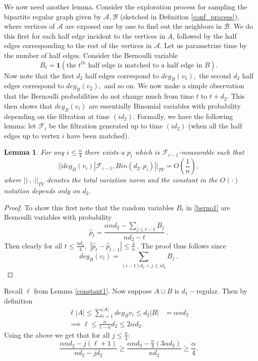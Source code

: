\documentclass[11pt,reqno]{amsart}
\newtheorem{lemma}{Lemma}
\begin{document}
 
We now need another lemma. Consider the exploration process for
sampling the bipartite regular graph given by
$\mathcal{A},\mathcal{B}$ (sketched in  Definition
\ref{conf_process}), where vertices of $\mathcal{A}$ are exposed one
by one to find out the neighbors in $\mathcal{B}.$ We do this first
for each half edge incident to the vertices in $A$,  followed by the half edges corresponding to the rest of the vertices in $\mathcal{A}.$ Let us parametrize time by the number of half edges. Consider the Bernoulli variable
\begin{equation}\label{berno1}
B_t=\mathbf{1}(\mbox{the $t^{th}$ half edge is matched to a half edge in }B).
\end{equation}
Now note that the first $d_2$ half edges correspond to $deg_{B}(v_1),$ the second $d_2$ half edges correspond to $deg_{B}(v_2),$ and so on. 
We now make a simple observation that the Bernoulli probabilities do not change much from time $t$ to $t+d_2.$ This then shows that $deg_{B}(v_i)$ are essentially Binomial variables with probability depending on the filtration at time $(id_2).$
Formally, we have the following lemma: let $\mathcal{F}_i$ be the filtration generated up to time $(id_2)$ (when all the half edges up to vertex $i$ have been matched).
\begin{lemma}\label{totalvar1}For any $i\le \frac{n}{4}$ there exists a $p_i$ which is $\mathcal{F}_{i-1}$-measurable such that $$||deg_{B}(v_i)| \mathcal{F}_{i-1},Bin(d_2,p_i)||_{TV}= O\left(\frac{1}{n}\right),$$  where $||\cdot, \cdot||_{TV}$ denotes the total variation norm and the constant in the $O(\cdot)$ notation depends only on $d_2.$
\end{lemma} 
 
\begin{proof}To show this first note that the random variables $B_{t}$ in \eqref{berno1}  are Bernoulli variables with probability $$\hat p _t=\frac{\alpha n d_2 -\sum_{j\le t-1}B_j}{nd_2-t}~.$$  Then clearly   
for all $t\le \frac{nd_2}{4},$ $|\hat p _t-\hat p _{t-1}|\le \frac{4}{n}~.$
The proof thus follows since $$deg_{B}(v_i)=\sum_{(i-1)d_2<j\le id_2}B_j~.$$
\end{proof} 
\noindent
Recall $\ell$ from Lemma \ref{constant1}. Now suppose $A\cup B$ is $d_1-$regular. Then by definition 
\begin{align*}
\ell |A|\le \sum_{i=1}^{|A|}deg_{B}v_i\le d_2|B|& =\alpha n d_2 \\
\implies \ell \le \frac{\alpha}{1-\alpha}d_2 \le 2\alpha d_2.
\end{align*}
\noindent 
Using the above we get that for all $j\le \frac{n}{4}$:
\begin{equation}\label{lb1}
\frac{\alpha nd_2-j(\ell+1)}{nd_2-jd_2}\ge\frac{\alpha nd_2-\frac{n}{4}(3\alpha d_2)}{nd_2}\ge  \frac{\alpha}{4}.
\end{equation}
\end{document}
